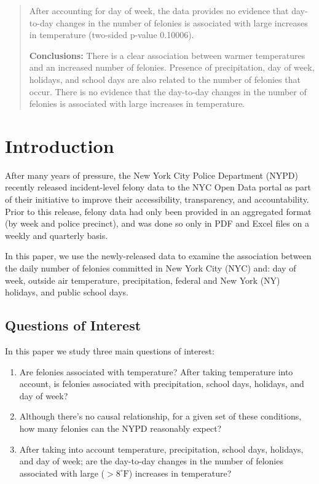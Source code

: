 \documentclass[11pt,notitlepage]{article}
\newcommand{\degf}{^\circ\text{F}}
\begin{document}
\begin{abstract}
After accounting for day of week, the data provides no evidence that day-to-day changes in the number of felonies is associated with large increases in temperature (two-sided p-value 0.10006).

\noindent \textbf{Conclusions:} There is a clear association between warmer temperatures and an increased number of felonies. Presence of precipitation, day of week, holidays, and school days are also related to the number of felonies that occur. There is no evidence that the day-to-day changes in the number of felonies is associated with large increases in temperature.




\end{abstract}



\pagebreak

\singlespacing



\section{Introduction}



After many years of pressure, the New York City Police Department (NYPD) recently released incident-level felony data to the NYC Open Data portal as part of their initiative to improve their accessibility, transparency, and accountability. Prior to this release, felony data had only been provided in an aggregated format (by week and police precinct), and was done so only in PDF and Excel files on a weekly and quarterly basis.

In this paper, we use the newly-released data to examine the association between the daily number of felonies committed in New York City (NYC) and: day of week, outside air temperature, precipitation, federal and New York (NY) holidays, and public school days.

\subsection{Questions of Interest}

In this paper we study three main questions of interest:

\begin{enumerate}
\setlength\itemsep{-1pt}
\item Are felonies associated with temperature? After taking temperature into account, is felonies associated with precipitation, school days, holidays, and day of week?
\item Although there's no causal relationship, for a given set of these conditions, how many felonies can the NYPD reasonably expect?
\item After taking into account temperature, precipitation, school days, holidays, and day of week; are the day-to-day changes in the number of felonies associated with large ($>8 \degf$) increases in temperature?
\end{enumerate}
\end{document}
